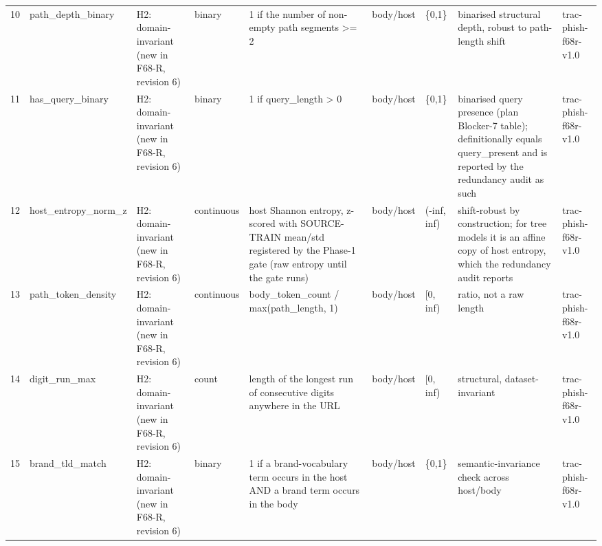 \begin{tabular}{rllllllll}
10 & path\_depth\_binary & H2: domain-invariant (new in F68-R, revision 6) & binary & 1 if the number of non-empty path segments >= 2 & body/host & \{0,1\} & binarised structural depth, robust to path-length shift & trac-phish-f68r-v1.0 \\
11 & has\_query\_binary & H2: domain-invariant (new in F68-R, revision 6) & binary & 1 if query\_length > 0 & body/host & \{0,1\} & binarised query presence (plan Blocker-7 table); definitionally equals query\_present and is reported by the redundancy audit as such & trac-phish-f68r-v1.0 \\
12 & host\_entropy\_norm\_z & H2: domain-invariant (new in F68-R, revision 6) & continuous & host Shannon entropy, z-scored with SOURCE-TRAIN mean/std registered by the Phase-1 gate (raw entropy until the gate runs) & body/host & (-inf, inf) & shift-robust by construction; for tree models it is an affine copy of host entropy, which the redundancy audit reports & trac-phish-f68r-v1.0 \\
13 & path\_token\_density & H2: domain-invariant (new in F68-R, revision 6) & continuous & body\_token\_count / max(path\_length, 1) & body/host & [0, inf) & ratio, not a raw length & trac-phish-f68r-v1.0 \\
14 & digit\_run\_max & H2: domain-invariant (new in F68-R, revision 6) & count & length of the longest run of consecutive digits anywhere in the URL & body/host & [0, inf) & structural, dataset-invariant & trac-phish-f68r-v1.0 \\
15 & brand\_tld\_match & H2: domain-invariant (new in F68-R, revision 6) & binary & 1 if a brand-vocabulary term occurs in the host AND a brand term occurs in the body & body/host & \{0,1\} & semantic-invariance check across host/body & trac-phish-f68r-v1.0 \\
\bottomrule
\end{tabular}
